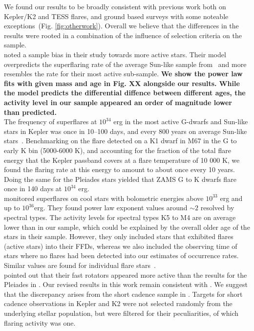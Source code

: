 \documentclass{aa}
\begin{document}
We found our results to be broadly consistent with previous work both on Kepler/K2 and TESS flares, and ground based surveys with some noteable exceptions~(Fig. \ref{fig:otherwork}). Overall we believe that the differences in the results were rooted in a combination of the influence of selection criteria on the sample. 
\\
\citet{davenport_flaresevolve_2019} noted a sample bias in their study towards more active stars. Their model overpredicts the superflaring rate of the average Sun-like sample from~\citet{shibayama_2013} and more resembles the rate for their most active sub-sample. \textbf{We show the power law fits with given mass and age in Fig. XX alongside our results. While the model predicts the differential diffence between different ages, the activity level in our sample appeared an order of magnitude lower than predicted.}
\\
The frequency of superflares at $10^{34}$ erg in the most active G-dwarfs and Sun-like stars in Kepler was once in 10–100 days, and every 800 years on average Sun-like stars~\citep{shibayama_2013}. Benchmarking on the flare detected on a K1 dwarf in M67 in the G to early K bin (5000-6000 K), and accounting for the fraction of the total flare energy that the Kepler passband covers at a flare temperature of 10 000 K, we found the flaring rate at this energy to amount to about once every 10 years. Doing the same for the Pleiades stars yielded that ZAMS G to K dwarfs flare once in 140 days at $10^{34}$ erg.
\\
\citet{howard2019} monitored superflares on cool stars with bolometric energies above $10^{33}$ erg and up to $10^{36}$erg. They found power law exponent values around $\sim 2$ resolved by spectral types. The activity levels for spectral types K5 to M4 are on average lower than in our sample, which could be explained by the overall older age of the stars in their sample. However, they only included stars that exhibited flares (active stars) into their FFDs, whereas we also included the observing time of stars where no flares had been detected into our estimates of occurrence rates. Similar values are found for individual flare stars~\citep{lurie_kepler_2015}.
\\
\citet{2020arXiv200311937R} pointed out that their fast rotators appeared more active than the results for the Pleiades in \citet{ilin_flares_2019}. Our revised results in this work remain consistent with \citet{ilin_flares_2019}. We suggest that the discrepancy arises from the short cadence sample in \citet{2020arXiv200311937R}. Targets for short cadence observations in Kepler and K2 were not selected randomly from the underlying stellar population, but were filtered for their peculiarities, of which flaring activity was one.
\end{document}
